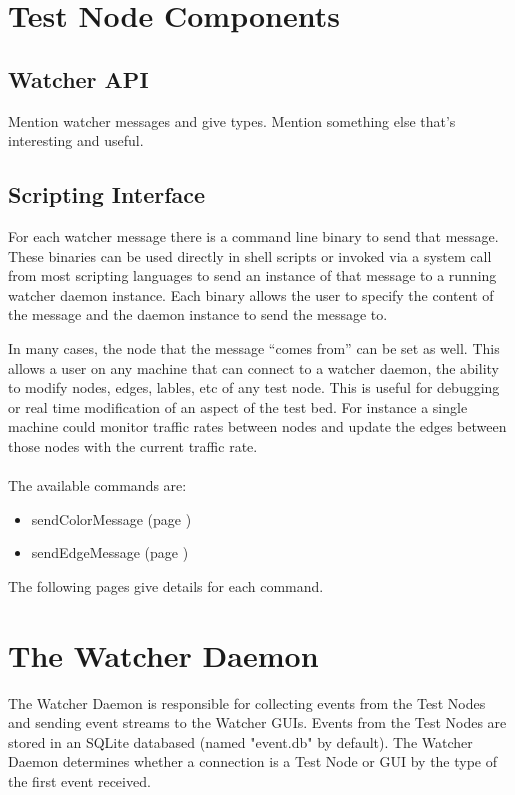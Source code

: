 \documentclass{article}
\begin{document}
\section{Test Node Components}
\subsection{Watcher API}
Mention watcher messages and give types. Mention something else that's interesting and useful. 

\subsection{Scripting Interface}
For each watcher message there is a command line binary to send that message. These binaries can be used directly in shell scripts or invoked via a system call from most scripting languages to send 
an instance of that message to a running watcher daemon instance. Each binary allows the user to specify the content of the message and the daemon instance to send the message to. 

In many cases, the 
node that the message ``comes from'' can be set as well. This allows a user on any machine that can connect to a watcher daemon, the ability to modify nodes, edges, lables, etc of any 
test node. This is useful for debugging or real time modification of an aspect of the test bed. For instance a single machine could monitor traffic rates between nodes and update 
the edges between those nodes with the current traffic rate. 
\\\\
The available commands are:
\begin{itemize}
\item sendColorMessage (page \pageref{sendColorMessage})
\item sendEdgeMessage (page \pageref{sendEdgeMessage})
\end{itemize}
The following pages give details for each command.



\section{The Watcher Daemon}

The Watcher Daemon is responsible for collecting events from the Test Nodes and
sending event streams to the Watcher GUIs.  Events from the Test Nodes are
stored in an SQLite databased (named "event.db" by default).  The Watcher Daemon
determines whether a connection is a Test Node or GUI by the type of the first
event received.
\end{document}

